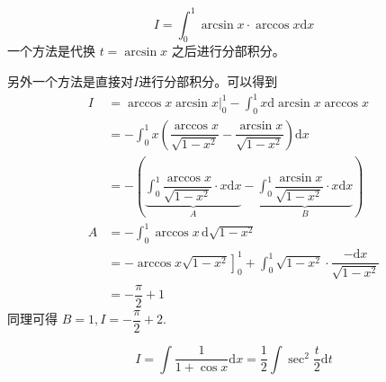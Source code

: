 \begin{example}
    \[
        I = \int_0^1 \arcsin x \cdot \arccos x \mathrm{d}x
    \]
    \cite[page 24, question 59]{w660}
    一个方法是代换 $t = \arcsin x$ 之后进行分部积分。

    另外一个方法是直接对$I$进行分部积分。可以得到
    \begin{align*}
        I &= \left. \arccos x \arcsin x \right|^{1}_{0} 
             - \int_0^1 x \mathrm{d} \arcsin x \arccos x \\
          &= - \int_0^1 x 
          \left(
              \dfrac{\arccos x}{\sqrt{1-x^2}} 
              - \dfrac{\arcsin x}{\sqrt{1-x^2}}
          \right)
          \mathrm{d}x \\
          &= - 
          \left(
              \underbrace{
                  \int_0^1
                      \dfrac{\arccos x}{\sqrt{1-x^2}} \cdot x
                  \mathrm{d}x 
              }_{A}
              -
              \underbrace{
                  \int_0^1
                      \dfrac{\arcsin x}{\sqrt{1-x^2}} \cdot x
                  \mathrm{d}x 
              }_{B}
          \right) \\[1em]
        A &= - \int_0^1 \arccos x \, \mathrm{d} \sqrt{1-x^2} \\
          &= \left.- \arccos x \sqrt{1-x^2}\right]_0^1 + \int_0^1 \sqrt{1-x^2} \cdot 
              \dfrac{-\mathrm{d}x}{\sqrt{1-x^2}} \\
          &= - \dfrac{\pi}{2} + 1 
    \end{align*}
    同理可得 $B = 1, I = -\dfrac{\pi}{2} + 2$.
\end{example}

\begin{example}
    \[
        I = \int \dfrac{1}{1+\cos x} \mathrm{d}x 
          = \dfrac{1}{2} \int \sec^2 \dfrac{t}{2} \mathrm{d}t
    \]
\end{example}

